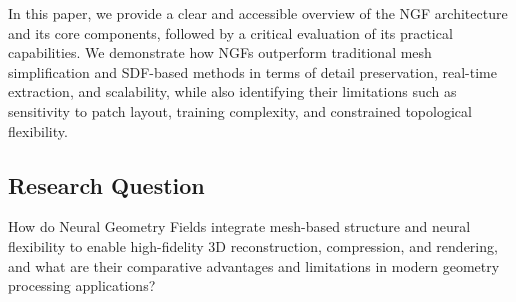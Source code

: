 In this paper, we provide a clear and accessible overview of the NGF architecture and its core components, followed by a critical evaluation of its practical capabilities.  
We demonstrate how NGFs outperform traditional mesh simplification and SDF-based methods in terms of detail preservation, real-time extraction, and scalability, while also identifying their limitations such as sensitivity to patch layout, training complexity, and constrained topological flexibility.  

\subsection{Research Question}  
How do Neural Geometry Fields integrate mesh-based structure and neural flexibility to enable high-fidelity 3D reconstruction, compression, and rendering, and what are their comparative advantages and limitations in modern geometry processing applications?